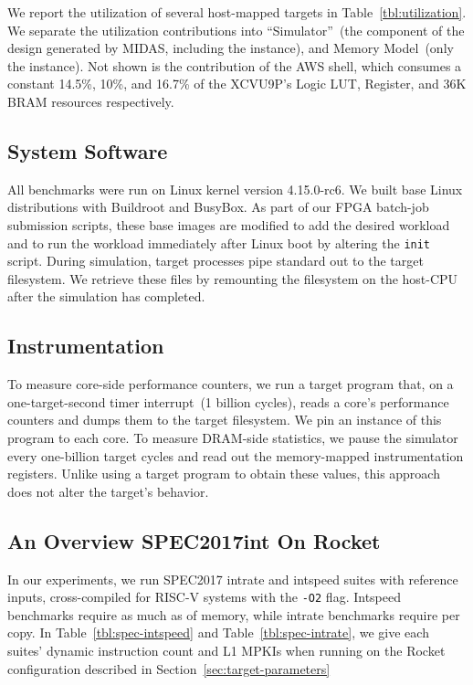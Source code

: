 We report the utilization of several host-mapped targets in
Table~\ref{tbl:utilization}.  We separate the utilization contributions into ``Simulator''~(the
component of the design generated by MIDAS, including the \PNAME instance),
and Memory Model~(only the \PNAME instance). Not shown is the contribution of the
AWS shell, which consumes a constant 14.5\%, 10\%, and 16.7\%  of the XCVU9P's
Logic LUT, Register, and 36K BRAM resources respectively.

\subsection{System Software}

All benchmarks were run on Linux kernel version 4.15.0-rc6. We built base Linux
distributions with Buildroot and BusyBox. As part of our FPGA batch-job submission
scripts, these base images are modified to add the desired workload and to run
the workload immediately after Linux boot by altering the \texttt{init}
script. During simulation, target processes pipe standard out to the target
filesystem. We retrieve these files by remounting the filesystem on the
host-CPU after the simulation has completed.

\subsection{Instrumentation}
To measure core-side performance counters, we run a target program that, on a
one-target-second timer interrupt~(1 billion cycles), reads a core's
performance counters and dumps them to the target filesystem. We pin an
instance of this program to each core. To measure DRAM-side statistics,
we pause the simulator every one-billion target cycles and read out the
memory-mapped instrumentation registers. Unlike using a target program to
obtain these values, this approach does not alter the target's behavior.

\subsection{An Overview SPEC2017int On Rocket}
In our experiments, we run SPEC2017 intrate and intspeed suites with reference
inputs, cross-compiled for RISC-V systems with the \texttt{-O2} flag.
Intspeed benchmarks require as much as  of memory, while intrate
benchmarks require  per copy.  In Table~\ref{tbl:spec-intspeed}
and Table~\ref{tbl:spec-intrate}, we give each suites' dynamic instruction
count and L1 MPKIs when running on the Rocket configuration described in
Section~\ref{sec:target-parameters}

